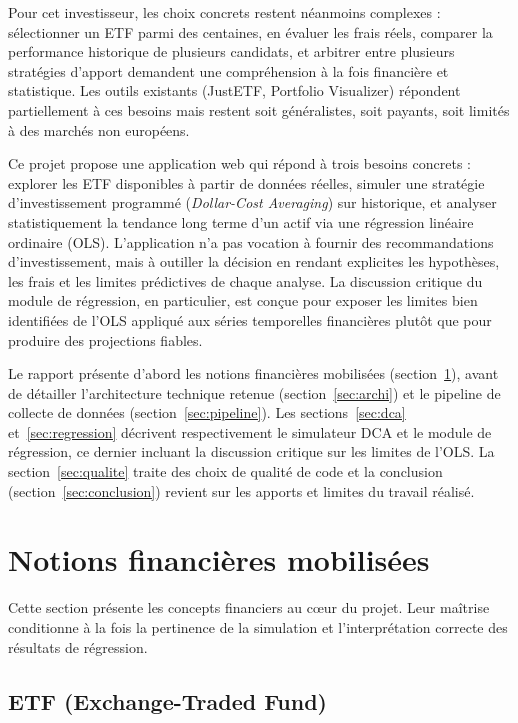 \documentclass[11pt,a4paper]{article}
\begin{document}
Pour cet investisseur, les choix concrets restent néanmoins complexes :
sélectionner un ETF parmi des centaines, en évaluer les frais réels,
comparer la performance historique de plusieurs candidats, et arbitrer
entre plusieurs stratégies d'apport demandent une compréhension à la fois
financière et statistique. Les outils existants (JustETF, Portfolio
Visualizer) répondent partiellement à ces besoins mais restent soit
généralistes, soit payants, soit limités à des marchés non européens.

Ce projet propose une application web qui répond à trois besoins concrets :
explorer les ETF disponibles à partir de données réelles, simuler une
stratégie d'investissement programmé (\textit{Dollar-Cost Averaging}) sur
historique, et analyser statistiquement la tendance long terme d'un actif
via une régression linéaire ordinaire (OLS). L'application n'a pas
vocation à fournir des recommandations d'investissement, mais à outiller la
décision en rendant explicites les hypothèses, les frais et les limites
prédictives de chaque analyse. La discussion critique du module de
régression, en particulier, est conçue pour exposer les limites bien
identifiées de l'OLS appliqué aux séries temporelles financières plutôt
que pour produire des projections fiables.

Le rapport présente d'abord les notions financières mobilisées
(section~\ref{sec:notions}), avant de détailler l'architecture technique
retenue (section~\ref{sec:archi}) et le pipeline de collecte de données
(section~\ref{sec:pipeline}). Les sections~\ref{sec:dca}
et~\ref{sec:regression} décrivent respectivement le simulateur DCA et le
module de régression, ce dernier incluant la discussion critique sur les
limites de l'OLS. La section~\ref{sec:qualite} traite des choix de qualité
de code et la conclusion (section~\ref{sec:conclusion}) revient sur les
apports et limites du travail réalisé.

\section{Notions financières mobilisées}
\label{sec:notions}

Cette section présente les concepts financiers au cœur du projet. Leur
maîtrise conditionne à la fois la pertinence de la simulation et
l'interprétation correcte des résultats de régression.

\subsection{ETF (Exchange-Traded Fund)}
\end{document}
